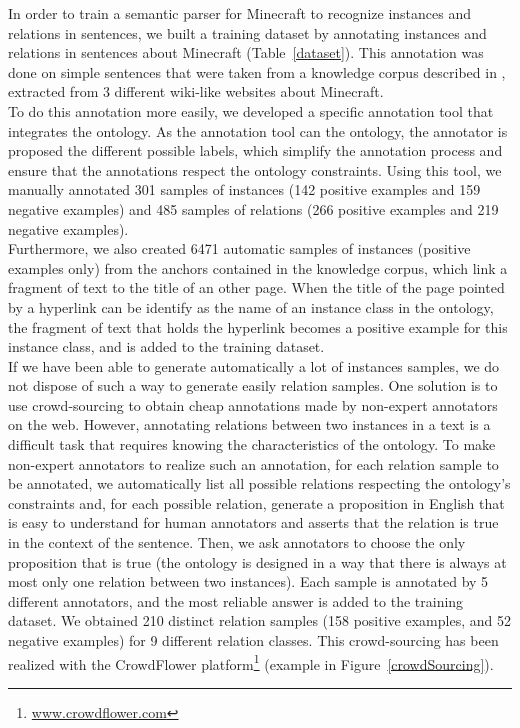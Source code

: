 \documentclass[twocolumn]{article}
\begin{document}
In order to train a semantic parser for Minecraft to recognize instances and relations in sentences, we built a training dataset by annotating instances and relations in sentences about Minecraft (Table~\ref{dataset}). This annotation was done on simple sentences that were taken from a knowledge corpus described in \cite{dumont2016question}, extracted from 3 different wiki-like websites about Minecraft.\\
To do this annotation more easily, we developed a specific annotation tool that integrates the ontology. As the annotation tool can the ontology, the annotator is proposed the different possible labels, which simplify the annotation process and ensure that the annotations respect the ontology constraints. Using this tool, we manually annotated 301 samples of instances (142 positive examples and 159 negative examples) and 485 samples of relations (266 positive examples and 219 negative examples).\\
Furthermore, we also created 6471 automatic samples of instances (positive examples only) from the anchors contained in the knowledge corpus, which link a fragment of text to the title of an other page. When the title of the page pointed by a hyperlink can be identify as the name of an instance class in the ontology, the fragment of text that holds the hyperlink becomes a positive example for this instance class, and is added to the training dataset.\\
If we have been able to generate automatically a lot of instances samples, we do not dispose of such a way to generate easily relation samples. One solution is to use crowd-sourcing to obtain cheap annotations made by non-expert annotators on the web. However, annotating relations between two instances in a text is a difficult task that requires knowing the characteristics of the ontology. To make non-expert annotators to realize such an annotation, for each relation sample to be annotated, we automatically list all possible relations respecting the ontology's constraints and, for each possible relation, generate a proposition in English that is easy to understand for human annotators and asserts that the relation is true in the context of the sentence. Then, we ask annotators to choose the only proposition that is true (the ontology is designed in a way that there is always at most only one relation between two instances). Each sample is annotated by 5 different annotators, and the most reliable answer is added to the training dataset. We obtained 210 distinct relation samples (158 positive examples, and 52 negative examples) for 9 different relation classes. This crowd-sourcing has been realized with the CrowdFlower platform\footnote{\href{http://www.crowdflower.com/}{www.crowdflower.com}} (example in Figure~\ref{crowdSourcing}).
\end{document}
